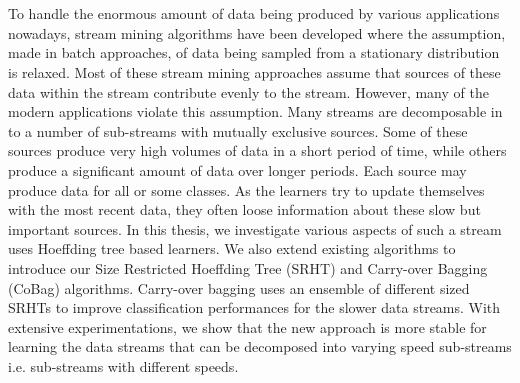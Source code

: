 \chapter{\abstractname}
To handle the enormous amount of data being produced by various applications nowadays, stream mining algorithms have been developed where the assumption, made in batch approaches, of data being sampled from a stationary distribution is relaxed.
Most of these stream mining approaches assume that sources of these data within the stream contribute evenly to the stream.
However, many of the modern applications violate this assumption. Many streams are decomposable in to a number of sub-streams with mutually exclusive sources. Some of these sources produce very high volumes of data in a short period of time, while others produce a significant amount of data over longer periods. Each source may produce data for all or some classes.
As the learners try to update themselves with the most recent data, they often loose information about these slow but important sources.
In this thesis, we investigate various aspects of such a stream uses Hoeffding tree based learners. We also extend existing algorithms to introduce our Size Restricted Hoeffding Tree (SRHT) and Carry-over Bagging (CoBag) algorithms. Carry-over bagging uses an ensemble of different sized SRHTs to improve classification performances for the slower data streams. With extensive experimentations, we show that the new approach is more stable for learning the data streams that can be decomposed into varying speed sub-streams i.e. sub-streams with different speeds.


